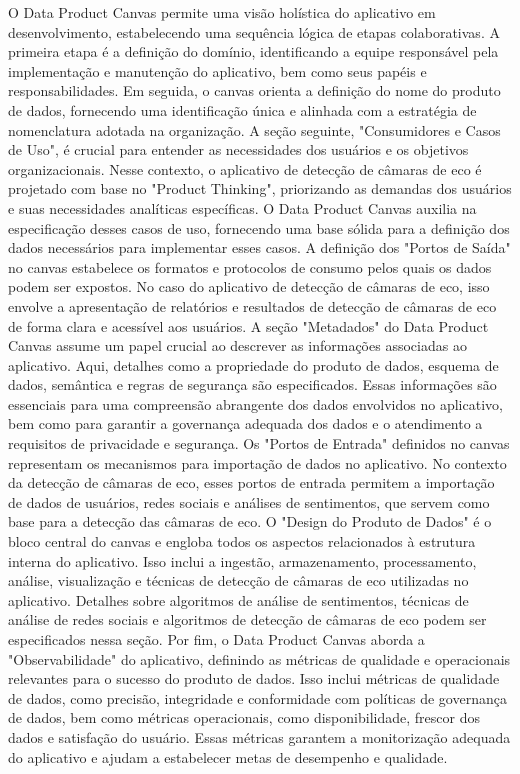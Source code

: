 O Data Product Canvas permite uma visão holística do aplicativo em desenvolvimento, estabelecendo uma sequência lógica de etapas colaborativas. A primeira etapa é a definição do domínio, identificando a equipe responsável pela implementação e manutenção do aplicativo, bem como seus papéis e responsabilidades. Em seguida, o canvas orienta a definição do nome do produto de dados, fornecendo uma identificação única e alinhada com a estratégia de nomenclatura adotada na organização. A seção seguinte, "Consumidores e Casos de Uso", é crucial para entender as necessidades dos usuários e os objetivos organizacionais. Nesse contexto, o aplicativo de detecção de câmaras de eco é projetado com base no "Product Thinking", priorizando as demandas dos usuários e suas necessidades analíticas específicas. O Data Product Canvas auxilia na especificação desses casos de uso, fornecendo uma base sólida para a definição dos dados necessários para implementar esses casos. A definição dos "Portos de Saída" no canvas estabelece os formatos e protocolos de consumo pelos quais os dados podem ser expostos. No caso do aplicativo de detecção de câmaras de eco, isso envolve a apresentação de relatórios e resultados de detecção de câmaras de eco de forma clara e acessível aos usuários. A seção "Metadados" do Data Product Canvas assume um papel crucial ao descrever as informações associadas ao aplicativo. Aqui, detalhes como a propriedade do produto de dados, esquema de dados, semântica e regras de segurança são especificados. Essas informações são essenciais para uma compreensão abrangente dos dados envolvidos no aplicativo, bem como para garantir a governança adequada dos dados e o atendimento a requisitos de privacidade e segurança. Os "Portos de Entrada" definidos no canvas representam os mecanismos para importação de dados no aplicativo. No contexto da detecção de câmaras de eco, esses portos de entrada permitem a importação de dados de usuários, redes sociais e análises de sentimentos, que servem como base para a detecção das câmaras de eco. O "Design do Produto de Dados" é o bloco central do canvas e engloba todos os aspectos relacionados à estrutura interna do aplicativo. Isso inclui a ingestão, armazenamento, processamento, análise, visualização e técnicas de detecção de câmaras de eco utilizadas no aplicativo. Detalhes sobre algoritmos de análise de sentimentos, técnicas de análise de redes sociais e algoritmos de detecção de câmaras de eco podem ser especificados nessa seção. Por fim, o Data Product Canvas aborda a "Observabilidade" do aplicativo, definindo as métricas de qualidade e operacionais relevantes para o sucesso do produto de dados. Isso inclui métricas de qualidade de dados, como precisão, integridade e conformidade com políticas de governança de dados, bem como métricas operacionais, como disponibilidade, frescor dos dados e satisfação do usuário. Essas métricas garantem a monitorização adequada do aplicativo e ajudam a estabelecer metas de desempenho e qualidade.

